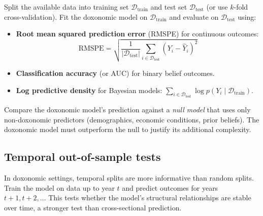 \begin{definition}
\label{def:predictive-validation}
Split the available data into training set $\mathcal{D}_{\text{train}}$ and test set $\mathcal{D}_{\text{test}}$ (or use $k$-fold cross-validation).
Fit the doxonomic model on $\mathcal{D}_{\text{train}}$ and evaluate on $\mathcal{D}_{\text{test}}$ using:
\begin{itemize}[nosep]
  \item \textbf{Root mean squared prediction error} (RMSPE) for continuous outcomes:
  \[
    \text{RMSPE} = \sqrt{\frac{1}{|\mathcal{D}_{\text{test}}|} \sum_{i \in \mathcal{D}_{\text{test}}} (Y_i - \hat{Y}_i)^2}
  \]
  \item \textbf{Classification accuracy} (or AUC) for binary belief outcomes.
  \item \textbf{Log predictive density} for Bayesian models: $\sum_{i \in \mathcal{D}_{\text{test}}} \log p(Y_i \mid \mathcal{D}_{\text{train}})$.
\end{itemize}
Compare the doxonomic model's prediction against a \emph{null model} that uses only non-doxonomic predictors (demographics, economic conditions, prior beliefs).
The doxonomic model must outperform the null to justify its additional complexity.
\end{definition}

\subsection{Temporal out-of-sample tests}

In doxonomic settings, temporal splits are more informative than random splits.
Train the model on data up to year $t$ and predict outcomes for years $t+1, t+2, \ldots$
This tests whether the model's structural relationships are stable over time, a stronger test than cross-sectional prediction.

